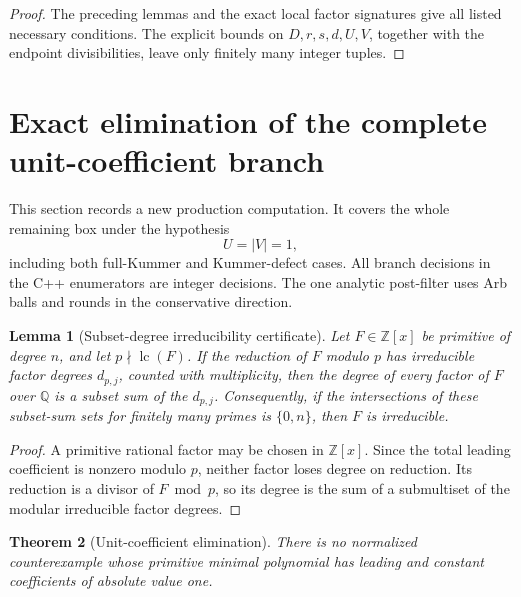 \documentclass[11pt]{article}
\newtheorem{theorem}{Theorem}[section]
\newtheorem{lemma}[theorem]{Lemma}
\theoremstyle{definition}
\newcommand{\Q}{\mathbb Q}
\newcommand{\Z}{\mathbb Z}
\begin{document}
\begin{proof}
The preceding lemmas and the exact local factor signatures give all listed
necessary conditions.  The explicit bounds on \(D,r,s,d,U,V\), together
with the endpoint divisibilities, leave only finitely many integer tuples.
\end{proof}

\section{Exact elimination of the complete unit-coefficient branch}
\label{sec:unitlowercomputation}

This section records a new production computation.  It covers the whole
remaining box under the hypothesis
\[
 U=|V|=1,
\]
including both full-Kummer and Kummer-defect cases.  All branch decisions in
the C++ enumerators are integer decisions.  The one analytic post-filter uses
Arb balls and rounds in the conservative direction.

\begin{lemma}[Subset-degree irreducibility certificate]
\label{lem:subsetdegreecertificate}
Let \(F\in\Z[x]\) be primitive of degree \(n\), and let
\(p\nmid\operatorname{lc}(F)\).  If the reduction of \(F\) modulo \(p\)
has irreducible factor degrees \(d_{p,j}\), counted with multiplicity, then
the degree of every factor of \(F\) over \(\Q\) is a subset sum of the
\(d_{p,j}\).  Consequently, if the intersections of these subset-sum sets
for finitely many primes is \(\{0,n\}\), then \(F\) is irreducible.
\end{lemma}

\begin{proof}
A primitive rational factor may be chosen in \(\Z[x]\).  Since the total
leading coefficient is nonzero modulo \(p\), neither factor loses degree on
reduction.  Its reduction is a divisor of \(F\bmod p\), so its degree is the
sum of a submultiset of the modular irreducible factor degrees.
\end{proof}

\begin{theorem}[Unit-coefficient elimination]\label{thm:unitelimination}
There is no normalized counterexample whose primitive minimal polynomial has
leading and constant coefficients of absolute value one.
\end{theorem}
\end{document}
